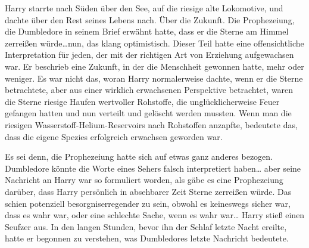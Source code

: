 Harry starrte nach Süden über den See, auf die riesige alte Lokomotive, und dachte über den Rest seines Lebens nach.
Über die Zukunft.
Die Prophezeiung, die Dumbledore in seinem Brief erwähnt hatte, dass er die Sterne am Himmel zerreißen würde…nun, das klang optimistisch. Dieser Teil hatte eine offensichtliche Interpretation für jeden, der mit der richtigen Art von Erziehung aufgewachsen war.
Er beschrieb eine Zukunft, in der die Menschheit gewonnen hatte, mehr oder weniger. Es war nicht das, woran Harry normalerweise dachte, wenn er die Sterne betrachtete, aber aus einer wirklich erwachsenen Perspektive betrachtet, waren die Sterne riesige Haufen wertvoller Rohstoffe, die unglücklicherweise Feuer gefangen hatten und nun verteilt und gelöscht werden mussten. Wenn man die riesigen Wasserstoff-Helium-Reservoirs nach Rohstoffen anzapfte, bedeutete das, dass die eigene Spezies erfolgreich erwachsen geworden war.

Es sei denn, die Prophezeiung hatte sich auf etwas ganz anderes bezogen. Dumbledore könnte die Worte eines Sehers falsch interpretiert haben… aber seine Nachricht an Harry war so formuliert worden, als gäbe es eine Prophezeiung darüber, dass Harry persönlich in absehbarer Zeit Sterne zerreißen würde. Das schien potenziell besorgniserregender zu sein, obwohl es keineswegs sicher war, dass es wahr war, oder eine schlechte Sache, wenn es wahr war… Harry stieß einen Seufzer aus. In den langen Stunden, bevor ihn der Schlaf letzte Nacht ereilte, hatte er begonnen zu verstehen, was Dumbledores letzte Nachricht bedeutete.

